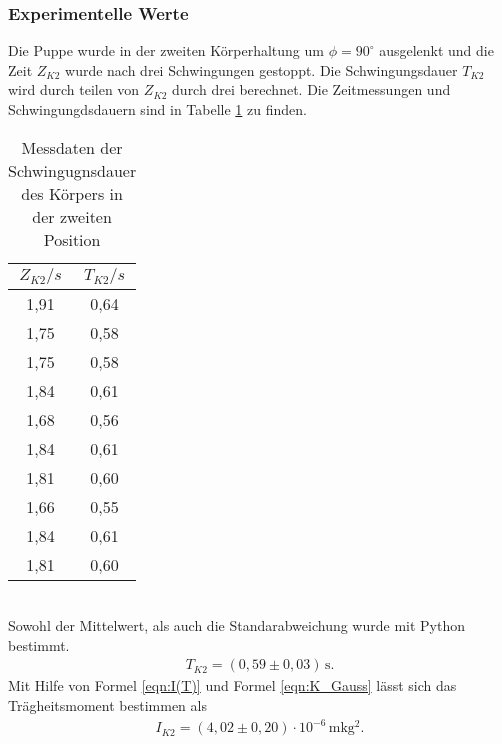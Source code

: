 \subsubsection{Experimentelle Werte}
Die Puppe wurde in der zweiten Körperhaltung um $\phi = 90^{\circ}$ ausgelenkt und die Zeit $Z_{K2}$
wurde nach drei Schwingungen gestoppt. Die Schwingungsdauer $T_{K2}$ wird durch teilen von $Z_{K2}$
durch drei berechnet. Die Zeitmessungen und Schwingungdsdauern sind in Tabelle \ref{tab:Koerper2} zu finden.
\begin{table}
  \centering
  \caption{Messdaten der Schwingugnsdauer des Körpers in der zweiten Position}
  \label{tab:Koerper2}
  \begin{tabular}{c c}
    \toprule
    $Z_{K2}/s$ & $T_{K2}/s$ \\
    \midrule
    1,91 & 0,64 \\
    1,75 & 0,58 \\
    1,75 & 0,58 \\
    1,84 & 0,61 \\
    1,68 & 0,56 \\
    1,84 & 0,61 \\
    1,81 & 0,60 \\
    1,66 & 0,55 \\
    1,84 & 0,61 \\
    1,81 & 0,60 \\
    \bottomrule
  \end{tabular}
\end{table}
\\
Sowohl der Mittelwert, als auch die Standarabweichung wurde mit Python bestimmt.
\begin{align*}
  T_{K2} = (0{,}59 \pm 0{,}03)\, \mathrm{s} .
\end{align*}
Mit Hilfe von Formel \ref{eqn:I(T)} und Formel \ref{eqn:K_Gauss} lässt sich das Trägheitsmoment bestimmen als
\begin{align*}
  I_{K2} = (4{,}02 \pm 0{,}20) \cdot 10^{-6}\, \mathrm{mkg^2}.
\end{align*}

